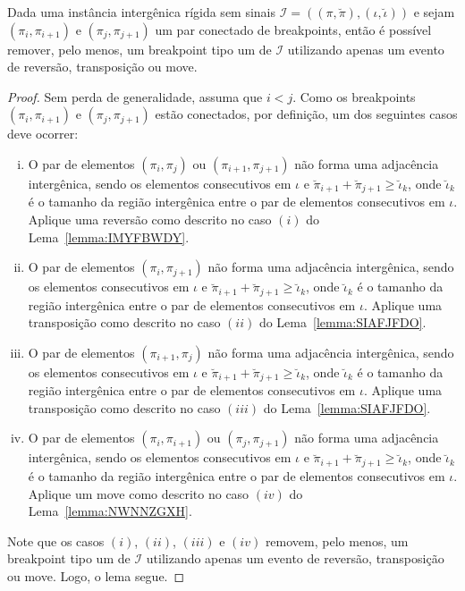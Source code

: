 \begin{lemma}\label{lemma:YLNUFQYG}
Dada uma instância intergênica rígida sem sinais $\mathcal{I} = ((\pi,\breve\pi),(\iota,\breve\iota))$ e sejam $(\pi_i,\pi_{i+1})$ e $(\pi_j,\pi_{j+1})$ um par conectado de breakpoints, então é possível remover, pelo menos, um breakpoint tipo um de $\mathcal{I}$ utilizando apenas um evento de reversão, transposição ou move.
\end{lemma}
\begin{proof}
Sem perda de generalidade, assuma que $i < j$. Como os breakpoints $(\pi_i,\pi_{i+1})$ e $(\pi_j,\pi_{j+1})$ estão conectados, por definição, um dos seguintes casos deve ocorrer:
\begin{enumerate}[i.]
  \item O par de elementos $(\pi_i,\pi_{j})$ ou $(\pi_{i+1},\pi_{j+1})$ não forma uma adjacência intergênica, sendo os elementos consecutivos em $\iota$ e $\breve\pi_{i+1} + \breve\pi_{j+1} \ge \breve\iota_k$, onde $\breve\iota_k$ é o tamanho da região intergênica entre o par de elementos consecutivos em $\iota$. Aplique uma reversão como descrito no caso $(i)$ do Lema~\ref{lemma:IMYFBWDY}.
  \item O par  de elementos $(\pi_i,\pi_{j+1})$ não forma uma adjacência intergênica, sendo os elementos consecutivos em $\iota$ e $\breve\pi_{i+1} + \breve\pi_{j+1} \ge \breve\iota_k$, onde $\breve\iota_k$ é o tamanho da região intergênica entre o par de elementos consecutivos em $\iota$. Aplique uma transposição como descrito no caso $(ii)$ do Lema~\ref{lemma:SIAFJFDO}.
  \item O par de elementos $(\pi_{i+1},\pi_{j})$ não forma uma adjacência intergênica, sendo os elementos consecutivos em $\iota$ e $\breve\pi_{i+1} + \breve\pi_{j+1} \ge \breve\iota_k$, onde $\breve\iota_k$ é o tamanho da região intergênica entre o par de elementos consecutivos em $\iota$. Aplique uma transposição como descrito no caso $(iii)$ do Lema~\ref{lemma:SIAFJFDO}.
  \item O par de elementos $(\pi_{i},\pi_{i+1})$ ou $(\pi_{j},\pi_{j+1})$ não forma uma adjacência intergênica, sendo os elementos consecutivos em $\iota$ e $\breve\pi_{i+1} + \breve\pi_{j+1} \ge \breve\iota_k$, onde $\breve\iota_k$ é o tamanho da região intergênica entre o par de elementos consecutivos em $\iota$. Aplique um move como descrito no caso $(iv)$ do Lema~\ref{lemma:NWNNZGXH}.
\end{enumerate}
Note que os casos $(i)$, $(ii)$, $(iii)$ e $(iv)$ removem, pelo menos, um breakpoint tipo um de $\mathcal{I}$ utilizando apenas um evento de reversão, transposição ou move. Logo, o lema segue. 
\end{proof}

